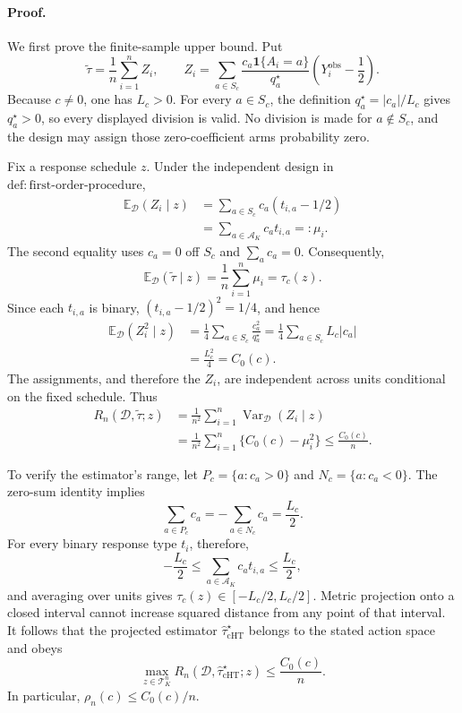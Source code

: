 \paragraph{Proof.}
We first prove the finite-sample upper bound.  Put
\[
 \widetilde\tau=\frac1n\sum_{i=1}^n Z_i,
 \qquad
 Z_i=\sum_{a\in S_c}
 \frac{c_a\mathbf 1\{A_i=a\}}{q_a^\star}
 \left(Y_i^{\mathrm{obs}}-\frac12\right).
\]
Because \(c\neq0\), one has \(L_c>0\).  For every \(a\in S_c\), the definition
\(q_a^\star=|c_a|/L_c\) gives \(q_a^\star>0\), so every displayed division is valid.  No division is made for \(a\notin S_c\), and the design may assign those zero-coefficient arms probability zero.

Fix a response schedule \(z\).  Under the independent design in \(\mathrm{def:first\text{-}order\text{-}procedure}\),
\[
 \begin{aligned}
 \mathbb E_{\mathcal D}(Z_i\mid z)
 &=\sum_{a\in S_c}c_a(t_{i,a}-1/2)\\
 &=\sum_{a\in\mathcal A_K}c_at_{i,a}=:\mu_i.
 \end{aligned}
\]
The second equality uses \(c_a=0\) off \(S_c\) and \(\sum_a c_a=0\).  Consequently,
\[
 \mathbb E_{\mathcal D}(\widetilde\tau\mid z)
 =\frac1n\sum_{i=1}^n\mu_i=\tau_c(z).
\]
Since each \(t_{i,a}\) is binary, \((t_{i,a}-1/2)^2=1/4\), and hence
\[
 \begin{aligned}
 \mathbb E_{\mathcal D}(Z_i^2\mid z)
 &=\frac14\sum_{a\in S_c}\frac{c_a^2}{q_a^\star}
 =\frac14\sum_{a\in S_c}L_c|c_a|\\
 &=\frac{L_c^2}{4}=C_0(c).
 \end{aligned}
\]
The assignments, and therefore the \(Z_i\), are independent across units conditional on the fixed schedule.  Thus
\[
 \begin{aligned}
 R_n(\mathcal D,\widetilde\tau;z)
 &=\frac1{n^2}\sum_{i=1}^n\operatorname{Var}_{\mathcal D}(Z_i\mid z)\\
 &=\frac1{n^2}\sum_{i=1}^n\{C_0(c)-\mu_i^2\}
 \leq\frac{C_0(c)}n.
 \end{aligned}
\]

To verify the estimator's range, let \(P_c=\{a:c_a>0\}\) and \(N_c=\{a:c_a<0\}\).  The zero-sum identity implies
\[
 \sum_{a\in P_c}c_a=-\sum_{a\in N_c}c_a=\frac{L_c}{2}.
\]
For every binary response type \(t_i\), therefore,
\[
 -\frac{L_c}{2}\leq\sum_{a\in\mathcal A_K}c_at_{i,a}\leq\frac{L_c}{2},
\]
and averaging over units gives \(\tau_c(z)\in[-L_c/2,L_c/2]\).  Metric projection onto a closed interval cannot increase squared distance from any point of that interval.  It follows that the projected estimator \(\widehat\tau_{\mathrm{cHT}}^\star\) belongs to the stated action space and obeys
\[
 \max_{z\in\mathcal T_K^n}
 R_n(\mathcal D,\widehat\tau_{\mathrm{cHT}}^\star;z)
 \leq\frac{C_0(c)}n.
\]
In particular, \(\rho_n(c)\leq C_0(c)/n\).

